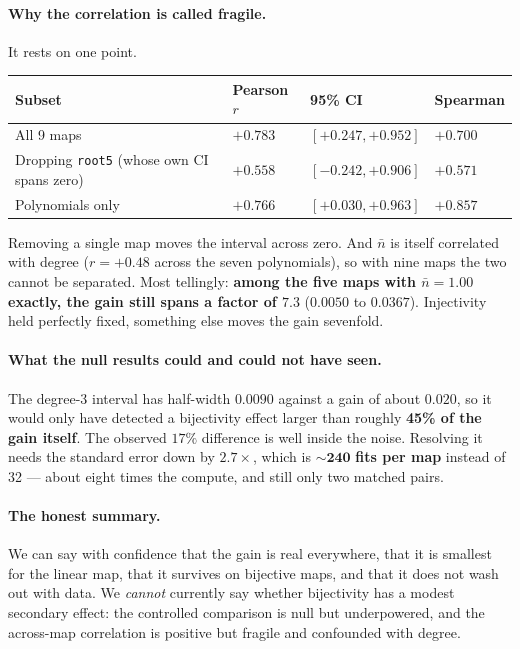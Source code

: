 \paragraph{Why the correlation is called fragile.} It rests on one point.

\begin{center}
\footnotesize
\begin{tabular}{llll}
\toprule
Subset & Pearson $r$ & 95\% CI & Spearman \\
\midrule
All 9 maps & $+0.783$ & $[+0.247,+0.952]$ & $+0.700$ \\
Dropping \texttt{root5} (whose own CI spans zero) & $+0.558$ & $[-0.242,+0.906]$ & $+0.571$ \\
Polynomials only & $+0.766$ & $[+0.030,+0.963]$ & $+0.857$ \\
\bottomrule
\end{tabular}
\end{center}

\noindent Removing a single map moves the interval across zero. And $\bar n$
is itself correlated with degree ($r=+0.48$ across the seven polynomials), so
with nine maps the two cannot be separated. Most tellingly: \textbf{among the
five maps with $\bar n=1.00$ exactly, the gain still spans a factor of
$7.3$} ($0.0050$ to $0.0367$). Injectivity held perfectly fixed, something
else moves the gain sevenfold.

\paragraph{What the null results could and could not have seen.} The degree-3
interval has half-width $0.0090$ against a gain of about $0.020$, so it would
only have detected a bijectivity effect larger than roughly \textbf{45\% of
the gain itself}. The observed $17\%$ difference is well inside the noise.
Resolving it needs the standard error down by $2.7\times$, which is
$\mathbf{\sim\!240}$ \textbf{fits per map} instead of 32 --- about eight times
the compute, and still only two matched pairs.

\paragraph{The honest summary.} We can say with confidence that the gain is
real everywhere, that it is smallest for the linear map, that it survives on
bijective maps, and that it does not wash out with data. We \emph{cannot}
currently say whether bijectivity has a modest secondary effect: the
controlled comparison is null but underpowered, and the across-map correlation
is positive but fragile and confounded with degree.
